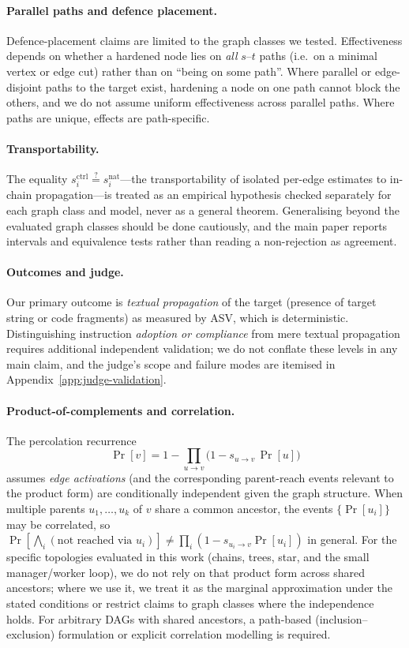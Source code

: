 \documentclass[sigconf,anonymous]{aamas}
\newcommand{\scite}[1]{\ensuremath{s^{\mathrm{ctrl}}_{#1}}}
\newcommand{\snat}[1]{\ensuremath{s^{\mathrm{nat}}_{#1}}}
\begin{document}
\paragraph{Parallel paths and defence placement.} Defence-placement claims are limited
to the graph classes we tested. Effectiveness depends on whether a hardened node lies
on \emph{all} $s$--$t$ paths (i.e.\ on a minimal vertex or edge cut) rather than on
``being on some path''. Where parallel or edge-disjoint paths to the target exist,
hardening a node on one path cannot block the others, and we do not assume uniform
effectiveness across parallel paths. Where paths are unique, effects are path-specific.

\paragraph{Transportability.} The equality $\scite{i} \stackrel{?}{=} \snat{i}$---the
transportability of isolated per-edge estimates to in-chain propagation---is treated as
an empirical hypothesis checked separately for each graph class and model, never as a
general theorem. Generalising beyond the evaluated graph classes should be done
cautiously, and the main paper reports intervals and equivalence tests rather than
reading a non-rejection as agreement.

\paragraph{Outcomes and judge.} Our primary outcome is \emph{textual propagation} of
the target (presence of target string or code fragments) as measured by ASV, which is
deterministic. Distinguishing instruction \emph{adoption or compliance} from mere
textual propagation requires additional independent validation; we do not conflate
these levels in any main claim, and the judge's scope and failure modes are itemised in
Appendix~\ref{app:judge-validation}.

\paragraph{Product-of-complements and correlation.} The percolation recurrence
\[
\Pr[v] = 1 - \prod_{u \to v}\!\bigl(1 - s_{u\to v}\,\Pr[u]\bigr)
\]
assumes \emph{edge activations} (and the corresponding parent-reach events relevant to the
product form) are conditionally independent given the graph structure. When multiple
parents $u_1,\ldots,u_k$ of $v$ share a common ancestor, the events $\{\Pr[u_i]\}$ may be
correlated, so $\Pr[\bigwedge_i (\text{not reached via }u_i)] \neq \prod_i (1 - s_{u_i\to v}\Pr[u_i])$
in general. For the specific topologies evaluated in this work (chains, trees, star,
and the small manager/worker loop), we do not rely on that product form across shared
ancestors; where we use it, we treat it as the marginal approximation under the stated
conditions or restrict claims to graph classes where the independence holds. For
arbitrary DAGs with shared ancestors, a path-based (inclusion--exclusion) formulation
or explicit correlation modelling is required.
\end{document}
